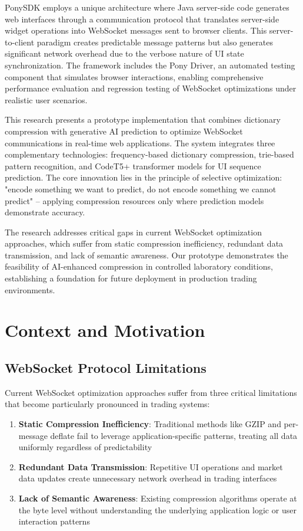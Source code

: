 \documentclass[12pt,a4paper]{article}
\begin{document}
PonySDK employs a unique architecture where Java server-side code generates web interfaces through a communication protocol that translates server-side widget operations into WebSocket messages sent to browser clients. This server-to-client paradigm creates predictable message patterns but also generates significant network overhead due to the verbose nature of UI state synchronization. The framework includes the Pony Driver, an automated testing component that simulates browser interactions, enabling comprehensive performance evaluation and regression testing of WebSocket optimizations under realistic user scenarios.

This research presents a prototype implementation that combines dictionary compression with generative AI prediction to optimize WebSocket communications in real-time web applications. The system integrates three complementary technologies: frequency-based dictionary compression, trie-based pattern recognition, and CodeT5+ transformer models for UI sequence prediction. The core innovation lies in the principle of selective optimization: "encode something we want to predict, do not encode something we cannot predict" -- applying compression resources only where prediction models demonstrate accuracy.

The research addresses critical gaps in current WebSocket optimization approaches, which suffer from static compression inefficiency, redundant data transmission, and lack of semantic awareness. Our prototype demonstrates the feasibility of AI-enhanced compression in controlled laboratory conditions, establishing a foundation for future deployment in production trading environments.

\section{Context and Motivation}

\subsection{WebSocket Protocol Limitations}

Current WebSocket optimization approaches suffer from three critical limitations that become particularly pronounced in trading systems:

\begin{enumerate}
    \item \textbf{Static Compression Inefficiency}: Traditional methods like GZIP and per-message deflate fail to leverage application-specific patterns, treating all data uniformly regardless of predictability
    \item \textbf{Redundant Data Transmission}: Repetitive UI operations and market data updates create unnecessary network overhead in trading interfaces
    \item \textbf{Lack of Semantic Awareness}: Existing compression algorithms operate at the byte level without understanding the underlying application logic or user interaction patterns
\end{enumerate}
\end{document}
